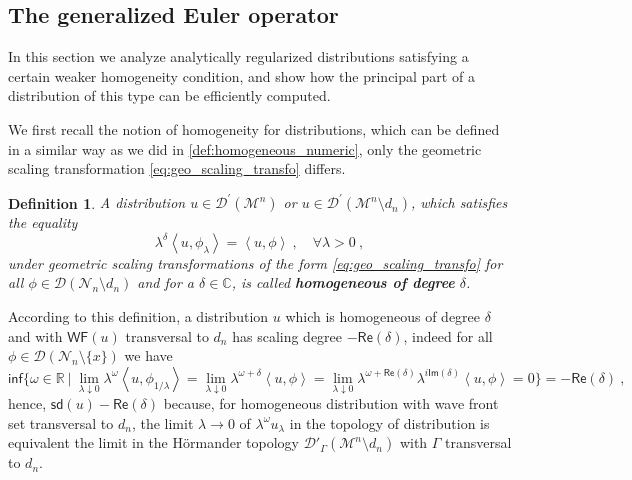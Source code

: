 \documentclass[11pt]{book}
\newcommand{\WF}{\mathsf{WF}}
\newcommand{\sd}{\mathsf{sd}}
\renewcommand{\Re}{\mathsf{Re}}
\renewcommand{\Im}{\mathsf{Im}}
\renewcommand{\inf}{\mathsf{inf}}
\newcommand{\sm}[1]{\left\langle#1\right\rangle}
\newcommand{\Dcal}{\mathcal{D}}
\newcommand{\Mcal}{\mathcal{M}}
\newcommand{\Ncal}{\mathcal{N}}
\newcommand{\Cbb}{\mathbb{C}}
\newcommand{\Rbb}{\mathbb{R}}
\theoremstyle{break}
\newtheorem{definition}{Definition}[chapter]
\begin{document}
\subsection{The generalized Euler operator}
\label{p:EULER}


In this section we analyze analytically regularized distributions satisfying a certain weaker homogeneity condition, and show how the principal part of a distribution of this type can be efficiently computed.

\bigskip


We first recall the notion of homogeneity for distributions, which can be defined in a similar way as we did in \ref{def:homogeneous_numeric}, only the geometric scaling transformation \eqref{eq:geo_scaling_transfo} differs.


\begin{definition}\label{def:homogeneous}
A distribution $u \in \Dcal^\prime(\Mcal^n)$ or $u\in \Dcal^\prime(\Mcal^n\setminus d_n)$, which satisfies the equality 
%
\begin{equation}
\lambda^{\delta} \sm{ u , \phi_\lambda } = \sm{ u , \phi } \ , \quad \forall \lambda > 0 \ , 
\label{eq:homo_distrib}
\end{equation}
%
under geometric scaling transformations of the form \eqref{eq:geo_scaling_transfo} for all $\phi\in\Dcal(\Ncal_n\setminus d_n)$ and for a $\delta\in\Cbb$, is called \textbf{homogeneous of degree} $\delta$. 
\end{definition}

According to this definition, a distribution $u$ which is homogeneous of degree $\delta$ and with $\WF{(u)}$ transversal to $d_n$ has scaling degree $-\Re(\delta)$, indeed for all $\phi\in\Dcal(\Ncal_n\setminus \{x\})$ we have
%
\begin{equation*}
\inf\bigg\{ \omega \in \Rbb \ \bigg| \ \lim_{\lambda \downarrow 0} \lambda^\omega \sm{u,\phi_{1/\lambda}} = \lim_{\lambda \downarrow 0} \lambda^{\omega+\delta} \sm{u,\phi} = \lim_{\lambda \downarrow 0} \lambda^{\omega+\Re(\delta)} \lambda^{i\Im(\delta)} \sm{u,\phi}
= 0  \bigg\} = - \Re(\delta) \ ,
\end{equation*}
%
hence, $\sd(u) -\Re(\delta)$ because, for homogeneous distribution with wave front set transversal to $d_n$, the limit $\lambda\to 0$ of $\lambda^\omega u_\lambda$ in the topology of distribution is equivalent the limit in the H\"ormander topology $\mathcal{D}'_\Gamma(\Mcal^n\setminus d_n)$ with $\Gamma$ transversal to $d_n$.
\end{document}
